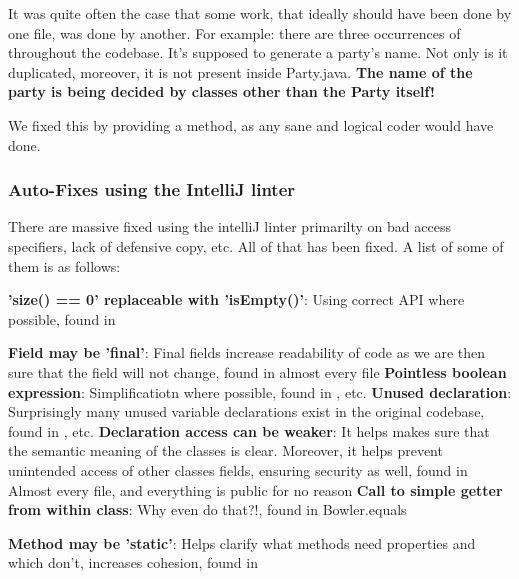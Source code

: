 It was quite often the case that some work, that ideally should have been done by one file, was done by another. For example: there are three occurrences of  throughout the codebase. It's supposed to generate a party's name. Not only is it duplicated, moreover, it is not present inside Party.java. \textbf{The name of the party is being decided by classes other than the Party itself!}

We fixed this by providing a  method, as any sane and logical coder would have done.


\subsubsection{Auto-Fixes using the IntelliJ linter}

There are massive fixed using the intelliJ linter primarilty on bad access specifiers, lack of defensive copy, etc. All of that has been fixed. A list of some of them is as follows:

\textbf{'size() == 0' replaceable with 'isEmpty()'}: Using correct API where possible, found in 

\textbf{Field may be 'final'}: 	Final fields increase readability of code as we are then sure that the field will not change, found in almost every file
\textbf{Pointless boolean expression}: Simplificatiotn where possible, found in , etc.
\textbf{Unused declaration}: Surprisingly many unused variable declarations exist in the original codebase, found in , etc.
\textbf{Declaration access can be weaker}: It helps makes sure that the semantic meaning of the classes is clear. Moreover, it helps prevent unintended access of other classes fields, ensuring security as well, found in Almost every file, and everything is public for no reason
\textbf{Call to simple getter from within class}: Why even do that?!, found in Bowler.equals

\textbf{Method may be 'static'}: Helps clarify what methods need properties and which don't, increases cohesion, found in 